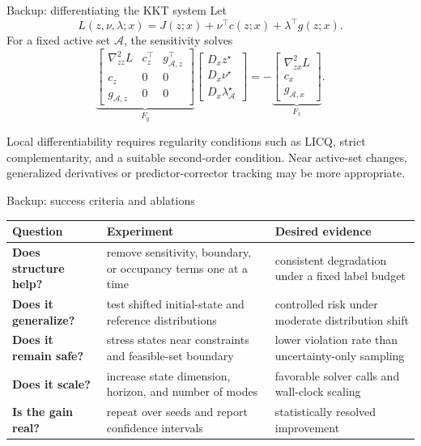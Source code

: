 \documentclass[aspectratio=169,10pt]{beamer}
\newcommand{\D}{\mathcal{D}}
\begin{document}
\begin{frame}{Backup: differentiating the KKT system}
Let
\[
L(z,\nu,\lambda;x)=J(z;x)+\nu^\top c(z;x)+\lambda^\top g(z;x).
\]
For a fixed active set $\mathcal A$, the sensitivity solves
\[
\underbrace{
\begin{bmatrix}
\nabla^2_{zz}L & c_z^\top & g_{\mathcal A,z}^\top\\
c_z & 0 & 0\\
g_{\mathcal A,z} & 0 & 0
\end{bmatrix}}_{F_y}
\begin{bmatrix}
D_xz^\star\\D_x\nu^\star\\D_x\lambda^\star_{\mathcal A}
\end{bmatrix}
=-
\underbrace{
\begin{bmatrix}
\nabla^2_{zx}L\\c_x\\g_{\mathcal A,x}
\end{bmatrix}}_{F_x}.
\]

Local differentiability requires regularity conditions such as LICQ, strict complementarity, and a suitable second-order condition. Near active-set changes, generalized derivatives or predictor-corrector tracking may be more appropriate.
\end{frame}

\begin{frame}{Backup: success criteria and ablations}
\renewcommand{\arraystretch}{1.4}
\begin{tabular}{>{\bfseries\color{Teal}}p{} p{} p{}}
\toprule
Question & Experiment & Desired evidence \\
\midrule
Does structure help? & remove sensitivity, boundary, or occupancy terms one at a time & consistent degradation under a fixed label budget \\
Does it generalize? & test shifted initial-state and reference distributions & controlled risk under moderate distribution shift \\
Does it remain safe? & stress states near constraints and feasible-set boundary & lower violation rate than uncertainty-only sampling \\
Does it scale? & increase state dimension, horizon, and number of modes & favorable solver calls and wall-clock scaling \\
Is the gain real? & repeat over seeds and report confidence intervals & statistically resolved improvement \\
\bottomrule
\end{tabular}
\end{frame}
\end{document}
